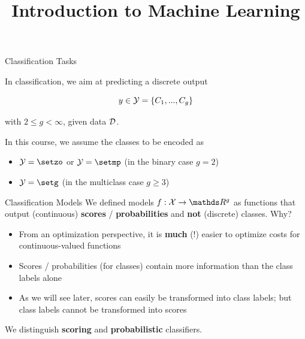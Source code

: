 \documentclass[11pt,compress,t,notes=noshow, xcolor=table]{beamer}
\title{Introduction to Machine Learning}
\institute{\href{https://compstat-lmu.github.io/lecture_i2ml/}{compstat-lmu.github.io/lecture\_i2ml}}
\date{}
\begin{document}
















\begin{vbframe}{Classification Tasks}

In classification, we aim at predicting a discrete output 

$$
y \in \mathcal{Y} = \{C_1, ..., C_g\}
$$

with $2 \le g < \infty$, given data $\mathcal{D}$.  

\lz 

In this course, we assume the classes to be encoded as

\begin{itemize}
  \item $\Yspace = \setzo$ or $\Yspace = \setmp$ (in the binary case $g = 2$)
  \item $\Yspace = \setg$  (in the multiclass case $g \ge 3$)
\end{itemize}

\vfill


\end{vbframe}


\begin{vbframe}{Classification Models} 
We defined models $f: \Xspace \to \R^g$ as functions that output (continuous) \textbf{scores} / \textbf{probabilities} and \textbf{not} (discrete) classes. Why? 

\begin{itemize}
  \item From an optimization perspective, it is \textbf{much} (!) easier to optimize costs for continuous-valued functions 
  \item Scores / probabilities (for classes) contain more information than the class labels alone
  \item As we will see later, scores can easily be transformed into class labels; but class labels cannot be transformed into scores
\end{itemize}

We distinguish \textbf{scoring} and \textbf{probabilistic} classifiers.
\end{vbframe}
\end{document}
